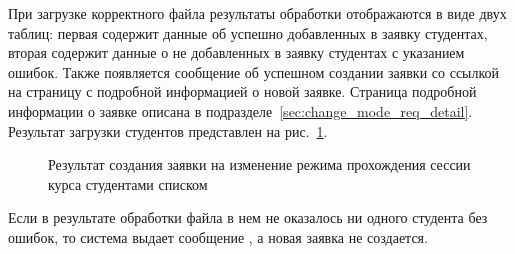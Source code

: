 При загрузке корректного файла результаты обработки отображаются в виде двух таблиц: 
первая содержит данные об успешно добавленных в заявку студентах, 
вторая содержит данные о не добавленных в заявку студентах с указанием ошибок. 
Также появляется сообщение об успешном создании заявки со ссылкой на страницу с подробной информацией о новой заявке.
Страница подробной информации о заявке описана в подразделе~\ref{sec:change_mode_req_detail}.
Результат загрузки студентов представлен на рис.~\ref{img:student:mass_change_mode_req_create_result}.

\begin{figure}[H]
	\caption{Результат создания заявки на изменение режима прохождения сессии курса студентами списком}
	\label{img:student:mass_change_mode_req_create_result}
\end{figure}

Если в результате обработки файла в нем не оказалось ни одного студента без ошибок, то 
система выдает сообщение , а новая заявка не создается.
